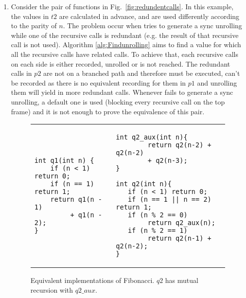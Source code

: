 \begin{enumerate}
\item Consider the pair of functions in Fig.~\ref{fig:redundentcalls}. In this example, the values in $t2$ are calculated in advance, and are used differently according to the parity of $n$. The problem occur when  tries to generate a sync unrolling while one of the recursive calls is redundant (e.g. the result of that recursive call is not used). Algorithm \ref{alg:Findunrolling} aims to find a value for which all the recursive calls have related calls. To achieve that, each recursive calls on each side is either recorded, unrolled or is not reached. The redundant calls in $p2$ are not on a branched path and therefore must be executed, can't be recorded as there is no equivalent recording for them in $p1$ and unrolling them will yield in more redundant calls. Whenever  fails to generate a sync unrolling, a default one is used (blocking every recursive call on the top frame) and it is not enough to prove the equivalence of this pair.


\begin{figure}[h]
\begin{center}
	\begin{tabular}{ll}
\begin{minipage}[t][5cm]{6 cm}
\begin{lstlisting}
int q1(int n) {
    if (n < 1) return 0;
    if (n == 1) return 1;
    return q1(n - 1) 
         + q1(n - 2);
}
\end{lstlisting}
\end{minipage} &
\begin{minipage}[t][5cm]{6 cm}
\begin{lstlisting}
int q2_aux(int n){
        return q2(n-2) + q2(n-2)
        + q2(n-3);
}

int q2(int n){
   if (n < 1) return 0;
   if (n == 1 || n == 2) return 1; 
   if (n % 2 == 0)
        return q2_aux(n);
   if (n % 2 == 1)
        return q2(n-1) + q2(n-2);
}
\end{lstlisting}
\end{minipage}
\end{tabular}
\caption{Equivalent implementations of Fibonacci. $q2$ has mutual recursion with $q2\_aux$.}
\label{fig:mutualrecursion}
\end{center}
\end{figure}


\end{enumerate}
